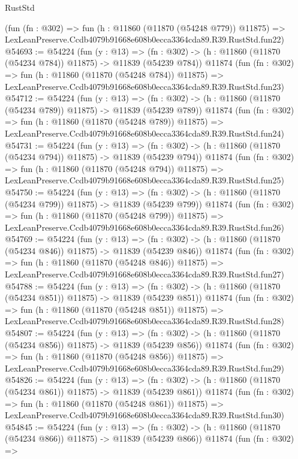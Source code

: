 \begin{lexlean}{RustStd}
\begin{coremodule}
    (fun (fn : @302) =>
    fun (h : @11860 (@11870 (@54248 @779)) @11875) =>
    LexLeanPreserve.Ccdb4079b91668e608b0ecca3364cda89.R39.RustStd.fun22)
@54693 := @54224
    (fun (y : @13) =>
    (fn : @302) -> (h : @11860 (@11870 (@54234 @784)) @11875) -> @11839 (@54239 @784))
    @11874
    (fun (fn : @302) =>
    fun (h : @11860 (@11870 (@54248 @784)) @11875) =>
    LexLeanPreserve.Ccdb4079b91668e608b0ecca3364cda89.R39.RustStd.fun23)
@54712 := @54224
    (fun (y : @13) =>
    (fn : @302) -> (h : @11860 (@11870 (@54234 @789)) @11875) -> @11839 (@54239 @789))
    @11874
    (fun (fn : @302) =>
    fun (h : @11860 (@11870 (@54248 @789)) @11875) =>
    LexLeanPreserve.Ccdb4079b91668e608b0ecca3364cda89.R39.RustStd.fun24)
@54731 := @54224
    (fun (y : @13) =>
    (fn : @302) -> (h : @11860 (@11870 (@54234 @794)) @11875) -> @11839 (@54239 @794))
    @11874
    (fun (fn : @302) =>
    fun (h : @11860 (@11870 (@54248 @794)) @11875) =>
    LexLeanPreserve.Ccdb4079b91668e608b0ecca3364cda89.R39.RustStd.fun25)
@54750 := @54224
    (fun (y : @13) =>
    (fn : @302) -> (h : @11860 (@11870 (@54234 @799)) @11875) -> @11839 (@54239 @799))
    @11874
    (fun (fn : @302) =>
    fun (h : @11860 (@11870 (@54248 @799)) @11875) =>
    LexLeanPreserve.Ccdb4079b91668e608b0ecca3364cda89.R39.RustStd.fun26)
@54769 := @54224
    (fun (y : @13) =>
    (fn : @302) -> (h : @11860 (@11870 (@54234 @846)) @11875) -> @11839 (@54239 @846))
    @11874
    (fun (fn : @302) =>
    fun (h : @11860 (@11870 (@54248 @846)) @11875) =>
    LexLeanPreserve.Ccdb4079b91668e608b0ecca3364cda89.R39.RustStd.fun27)
@54788 := @54224
    (fun (y : @13) =>
    (fn : @302) -> (h : @11860 (@11870 (@54234 @851)) @11875) -> @11839 (@54239 @851))
    @11874
    (fun (fn : @302) =>
    fun (h : @11860 (@11870 (@54248 @851)) @11875) =>
    LexLeanPreserve.Ccdb4079b91668e608b0ecca3364cda89.R39.RustStd.fun28)
@54807 := @54224
    (fun (y : @13) =>
    (fn : @302) -> (h : @11860 (@11870 (@54234 @856)) @11875) -> @11839 (@54239 @856))
    @11874
    (fun (fn : @302) =>
    fun (h : @11860 (@11870 (@54248 @856)) @11875) =>
    LexLeanPreserve.Ccdb4079b91668e608b0ecca3364cda89.R39.RustStd.fun29)
@54826 := @54224
    (fun (y : @13) =>
    (fn : @302) -> (h : @11860 (@11870 (@54234 @861)) @11875) -> @11839 (@54239 @861))
    @11874
    (fun (fn : @302) =>
    fun (h : @11860 (@11870 (@54248 @861)) @11875) =>
    LexLeanPreserve.Ccdb4079b91668e608b0ecca3364cda89.R39.RustStd.fun30)
@54845 := @54224
    (fun (y : @13) =>
    (fn : @302) -> (h : @11860 (@11870 (@54234 @866)) @11875) -> @11839 (@54239 @866))
    @11874
    (fun (fn : @302) =>

\end{coremodule}
\end{lexlean}
